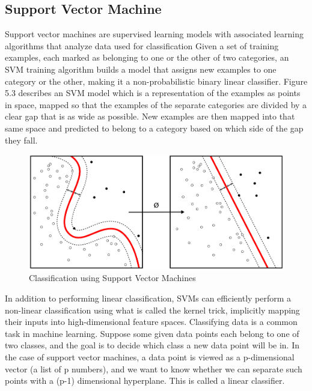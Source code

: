 \documentclass[paper=a4, fontsize=12pt]{scrartcl}
\numberwithin{equation}{section}		%
\numberwithin{figure}{section}			%
\numberwithin{table}{section}				%
\begin{document}
\subsection{Support Vector Machine}
Support vector machines are supervised learning models with associated learning algorithms that analyze data used for classification Given a set of training examples, each marked as belonging to one or the other of two categories, an SVM training algorithm builds a model that assigns new examples to one category or the other, making it a non-probabilistic binary linear classifier.
Figure 5.3 describes an SVM model which is a representation of the examples as points in space, mapped so that the examples of the separate categories are divided by a clear gap that is as wide as possible. New examples are then mapped into that same space and predicted to belong to a category based on which side of the gap they fall.
\begin{figure}[H]

\begin{center}

\includegraphics[scale=.6]{svm.png}

 \end{center}

  \caption{Classification using Support Vector Machines}

  \label{fig:}

\end{figure}
In addition to performing linear classification, SVMs can efficiently perform a non-linear classification using what is called the kernel trick, implicitly mapping their inputs into high-dimensional feature spaces. Classifying data is a common task in machine learning. Suppose some given data points each belong to one of two classes, and the goal is to decide which class a new data point will be in. In the case of support vector machines, a data point is viewed as a p-dimensional vector (a list of p numbers), and we want to know whether we can separate such points with a  (p-1) dimensional hyperplane. This is called a linear classifier.
\end{document}
